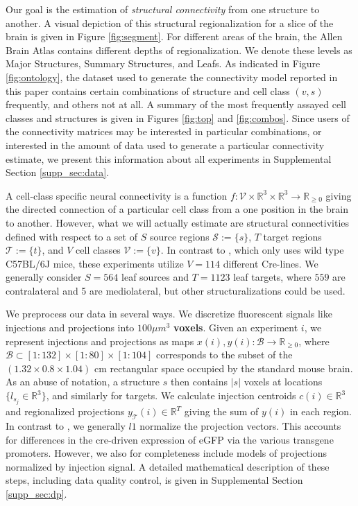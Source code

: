 Our goal is the estimation of \textit{structural connectivity} from one structure to another.
A visual depiction of this structural regionalization for a slice of the brain is given in Figure \ref{fig:segment}.
For different areas of the brain, the Allen Brain Atlas contains different depths of regionalization.
We denote these levels as Major Structures, Summary Structures, and Leafs.
As indicated in Figure \ref{fig:ontology}, the dataset used to generate the connectivity model reported in this paper contains certain combinations of structure and cell class $(v,s)$ frequently, and others not at all.
A summary of the most frequently assayed cell classes and structures is given in Figures \ref{fig:top} and \ref{fig:combos}.
Since users of the connectivity matrices may be interested in particular combinations, or interested in the amount of data used to generate a particular connectivity estimate, we present this information about all experiments in Supplemental Section \ref*{supp_sec:data}.

A cell-class specific neural connectivity is a function $f:  \mathcal V \times \mathbb R^3 \times \mathbb R^3 \to \mathbb R_{\geq 0}$ giving the directed connection of a particular cell class from a one position in the brain to another.
However, what we will actually estimate are structural connectivities defined with respect to a set of $S$ source regions $\mathcal S := \{ s\} $, $T$ target regions $\mathcal T := \{ t \}$, and $V$ cell classes $\mathcal V := \{v\}$.
In contrast to \citet{Knox2019-ot}, which only uses wild type C57BL/6J mice, these experiments utilize $V = 114$ different Cre-lines. 
We generally consider $S = 564$ leaf sources and $T = 1123$ leaf targets, where $559$ are contralateral and 5 are  mediolateral, but other structuralizations could be used.

We preprocess our data in several ways.
We discretize fluorescent signals like injections and projections into $100 \mu m^3$  \textbf{voxels}.
Given an experiment $i$, we represent injections and projections as maps $x(i),y(i) : \mathcal B \to \mathbb R_{\geq 0}$, where $\mathcal B \subset [1:132] \times [1:80] \times [1:104]$ corresponds to the subset of the $(1.32 \times 0.8 \times 1.04)$ cm rectangular space occupied by the standard mouse brain.
As an abuse of notation, a structure $s$ then contains $|s|$ voxels at locations $\{l_{s_j} \in \mathbb R^3\}$, and similarly for targets.
We calculate injection centroids $c(i) \in \mathbb R^3$ and regionalized projections $y_{\mathcal T} (i) \in \mathbb R^{T} $ giving the sum of $y(i)$ in each region.
In contrast to \citet{Knox2019-ot}, we generally $l1$ normalize the projection vectors.
This accounts for differences in the cre-driven expression of eGFP via the various transgene promoters.
However, we also for completeness include models of projections normalized by injection signal.
A detailed mathematical description of these steps, including data quality control, is given in Supplemental Section \ref{supp_sec:dp}.

